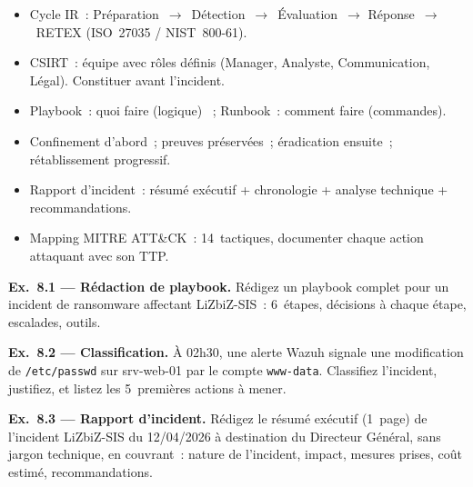 \begin{boxresume}
\begin{itemize}
  \item Cycle IR~: Préparation~$\to$~Détection~$\to$~Évaluation~$\to$
        Réponse~$\to$~RETEX (ISO~27035 / NIST~800-61).
  \item CSIRT~: équipe avec rôles définis (Manager, Analyste, Communication,
        Légal). Constituer avant l'incident.
  \item Playbook~: quoi faire (logique) ~; Runbook~: comment faire (commandes).
  \item Confinement d'abord~; preuves préservées~; éradication ensuite~;
        rétablissement progressif.
  \item Rapport d'incident~: résumé exécutif + chronologie + analyse
        technique + recommandations.
  \item Mapping MITRE ATT\&CK~: 14~tactiques, documenter chaque action
        attaquant avec son TTP.
\end{itemize}
\end{boxresume}

\begin{boxexo}
\textbf{Ex.~8.1 — Rédaction de playbook.}
Rédigez un playbook complet pour un incident de ransomware affectant
LiZbiZ-SIS~: 6~étapes, décisions à chaque étape, escalades, outils.

\medskip\textbf{Ex.~8.2 — Classification.}
À 02h30, une alerte Wazuh signale une modification de \texttt{/etc/passwd}
sur srv-web-01 par le compte \texttt{www-data}. Classifiez l'incident,
justifiez, et listez les 5~premières actions à mener.

\medskip\textbf{Ex.~8.3 — Rapport d'incident.}
Rédigez le résumé exécutif (1~page) de l'incident LiZbiZ-SIS du
12/04/2026 à destination du Directeur Général, sans jargon technique,
en couvrant~: nature de l'incident, impact, mesures prises,
coût estimé, recommandations.
\end{boxexo}
